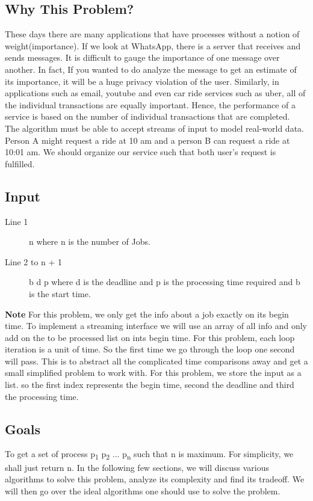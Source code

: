 \documentclass[11pt]{article}
\begin{document}
{				\subsection{Why This Problem?}
				These days there are many applications that have processes without a notion of weight(importance). If we look at WhatsApp, there is a server that receives and sends messages. It is difficult to gauge the importance of one message over another. In fact, If you wanted to do analyze the message to get an estimate of its importance, it will be a huge privacy violation of the user. Similarly, in applications such as email, youtube and even car ride services such as uber, all of the individual transactions are equally important. Hence, the performance of a service is based on the number of individual transactions that are completed.\\
				The algorithm must be able to accept streams of input to model real-world data. Person A might request a ride at 10 am and a person B can request a ride at 10:01 am. We should organize our service such that both user's request is fulfilled.
				
				\subsection{Input}
				\begin{description}
					\item[Line 1] n where n is the number of Jobs.
					\item[Line 2 to n + 1] b d p where d is the deadline and p is the processing time required and b is the start time.
				\end{description}
				\textbf{Note} For this problem, we only get the info about a job exactly on its begin time. To implement a streaming interface we will use an array of all info and only add on the to be processed list on ints begin time. For this problem, each loop iteration is a unit of time. So the first time we go through the loop one second will pass. This is to abstract all the complicated time comparisons away and get a small simplified problem to work with. For this problem, we store the input as a list. so the first index represents the begin time, second the deadline and third the processing time.
			
				
				\subsection{Goals}
				To get a set of process p\textsubscript{1} p\textsubscript{2} ... p\textsubscript{n} such that n is maximum.
				For simplicity, we shall just return n. In the following few sections, we will discuss various algorithms to solve this problem, analyze its complexity and find its tradeoff. We will then go over the ideal algorithms one should use to solve the problem.
				
}
\end{document}
